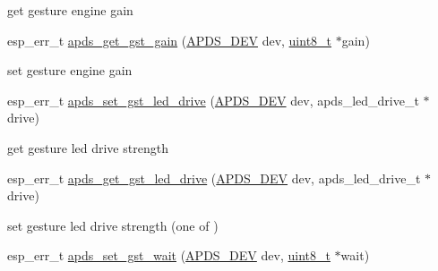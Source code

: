 \begin{DoxyCompactItemize}
\begin{DoxyCompactList}
\begin{DoxyItemize}
\item get gesture engine gain 
\end{DoxyItemize}\end{DoxyCompactList}\item 
esp\+\_\+err\+\_\+t \hyperlink{group__APDS9960__GestureFunctions_ga6d460e4b59df3406d2630463df4c3fc2}{apds\+\_\+get\+\_\+gst\+\_\+gain} (\hyperlink{structAPDS9960__Driver}{A\+P\+D\+S\+\_\+\+D\+EV} dev, \hyperlink{vl53l0x__types_8h_aba7bc1797add20fe3efdf37ced1182c5}{uint8\+\_\+t} $\ast$gain)
\begin{DoxyCompactList}\small\item\em 
\begin{DoxyItemize}
\item set gesture engine gain 
\end{DoxyItemize}\end{DoxyCompactList}\item 
esp\+\_\+err\+\_\+t \hyperlink{group__APDS9960__GestureFunctions_gab65e85fbffa4a5a6155a18d2eac7ce44}{apds\+\_\+set\+\_\+gst\+\_\+led\+\_\+drive} (\hyperlink{structAPDS9960__Driver}{A\+P\+D\+S\+\_\+\+D\+EV} dev, apds\+\_\+led\+\_\+drive\+\_\+t $\ast$drive)
\begin{DoxyCompactList}\small\item\em 
\begin{DoxyItemize}
\item get gesture led drive strength 
\end{DoxyItemize}\end{DoxyCompactList}\item 
esp\+\_\+err\+\_\+t \hyperlink{group__APDS9960__GestureFunctions_ga90bd6b0107185604545dc0cf875287c8}{apds\+\_\+get\+\_\+gst\+\_\+led\+\_\+drive} (\hyperlink{structAPDS9960__Driver}{A\+P\+D\+S\+\_\+\+D\+EV} dev, apds\+\_\+led\+\_\+drive\+\_\+t $\ast$drive)
\begin{DoxyCompactList}\small\item\em 
\begin{DoxyItemize}
\item set gesture led drive strength (one of ) 
\end{DoxyItemize}\end{DoxyCompactList}\item 
esp\+\_\+err\+\_\+t \hyperlink{group__APDS9960__GestureFunctions_gaae61fea94311fc6d49c6d542b0a5b519}{apds\+\_\+set\+\_\+gst\+\_\+wait} (\hyperlink{structAPDS9960__Driver}{A\+P\+D\+S\+\_\+\+D\+EV} dev, \hyperlink{vl53l0x__types_8h_aba7bc1797add20fe3efdf37ced1182c5}{uint8\+\_\+t} $\ast$wait)
\begin{DoxyCompactList}\small\item\em 

\end{DoxyCompactList}
\end{DoxyCompactItemize}
